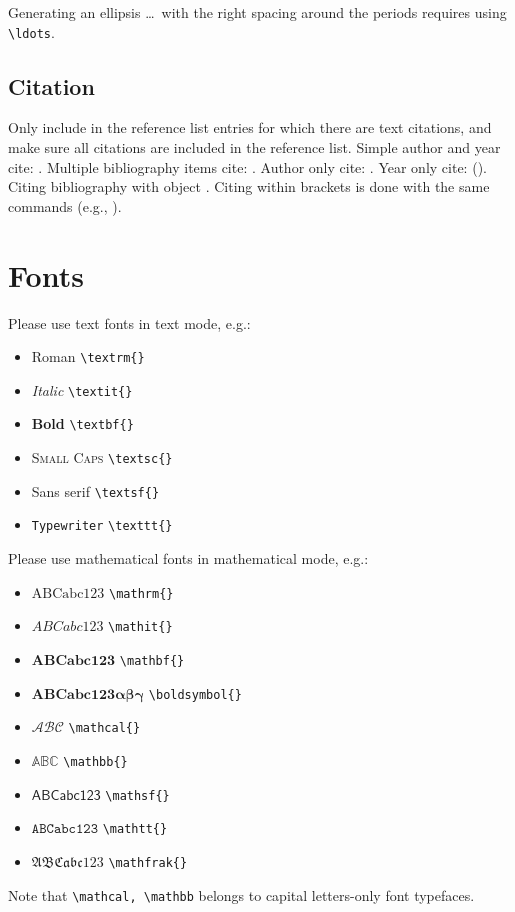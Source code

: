 \documentclass[ecta,nameyear,draft]{econsocart}
\theoremstyle{plain}
\theoremstyle{remark}
\begin{document}
Generating an ellipsis \ldots\ with the right spacing
around the periods requires using \verb|\ldots|.

\subsection{Citation}
Only include in the reference list entries for which there are text citations,
and make sure all citations are included in the reference list.
Simple author and year cite: \citet{b1}. 
Multiple bibliography items cite: \citet{b2,b3,b4,b5}.
Author only cite: \citeauthor{b4}.
Year only cite: (\citeyear{b4}). Citing bibliography with object \citet[Theorem 1]{b1}. Citing within brackets is done with the same commands (e.g., \citet{b2,b3,b4}).

\section{Fonts}
Please use text fonts in text mode, e.g.:
\begin{itemize}
\item[]\textrm{Roman} \verb|\textrm{}|
\item[]\textit{Italic} \verb|\textit{}|
\item[]\textbf{Bold} \verb|\textbf{}|
\item[]\textsc{Small Caps} \verb|\textsc{}|
\item[]\textsf{Sans serif} \verb|\textsf{}|
\item[]\texttt{Typewriter} \verb|\texttt{}|
\end{itemize}
Please use mathematical fonts in mathematical mode, e.g.:
\begin{itemize}
\item[] $\mathrm{ABCabc123}$ \verb|\mathrm{}|
\item[] $\mathit{ABCabc123}$ \verb|\mathit{}|
\item[] $\mathbf{ABCabc123}$ \verb|\mathbf{}|
\item[] $\boldsymbol{ABCabc123\alpha\beta\gamma}$ \verb|\boldsymbol{}|
\item[] $\mathcal{ABC}$ \verb|\mathcal{}|
\item[] $\mathbb{ABC}$ \verb|\mathbb{}|
\item[] $\mathsf{ABCabc123}$ \verb|\mathsf{}| 
\item[] $\mathtt{ABCabc123}$ \verb|\mathtt{}|
\item[] $\mathfrak{ABCabc123}$ \verb|\mathfrak{}|
\end{itemize}
Note that \verb|\mathcal, \mathbb| belongs to capital letters-only font typefaces.
\end{document}
